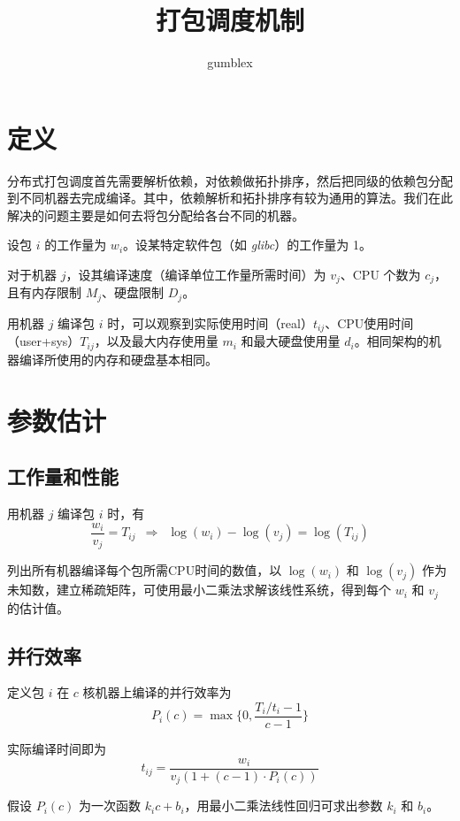\documentclass[UTF8,zihao=-4]{ctexart}
\title{打包调度机制}
\date{}
\author{gumblex}
\begin{document}
\maketitle

\section{定义}
分布式打包调度首先需要解析依赖，对依赖做拓扑排序，然后把同级的依赖包分配到不同机器去完成编译。其中，依赖解析和拓扑排序有较为通用的算法。我们在此解决的问题主要是如何去将包分配给各台不同的机器。

设包 $i$ 的工作量为 $w_i$。设某特定软件包（如 \textit{glibc}）的工作量为 1。

对于机器 $j$，设其编译速度（编译单位工作量所需时间）为 $v_j$、CPU 个数为 $c_j$，且有内存限制 $M_j$、硬盘限制 $D_j$。

用机器 $j$ 编译包 $i$ 时，可以观察到实际使用时间（real）$t_{ij}$、CPU使用时间（user+sys）$T_{ij}$，以及最大内存使用量 $m_i$ 和最大硬盘使用量 $d_i$。相同架构的机器编译所使用的内存和硬盘基本相同。

\section{参数估计}

\subsection{工作量和性能}

用机器 $j$ 编译包 $i$ 时，有
$$ \frac{w_i}{v_j} = T_{ij} \enspace \Rightarrow \enspace
\log(w_i) - \log(v_j) = \log(T_{ij})$$

列出所有机器编译每个包所需CPU时间的数值，以 $\log(w_i)$ 和 $\log(v_j)$ 作为未知数，建立稀疏矩阵，可使用最小二乘法求解该线性系统，得到每个 $w_i$ 和 $v_j$ 的估计值。

\subsection{并行效率}

定义包 $i$ 在 $c$ 核机器上编译的并行效率为 $$ P_i(c) = \max \{0, \frac{T_i/t_i-1}{c-1} \} $$

实际编译时间即为
\begin{equation}
\label{eq_ti} t_{ij} = \frac{w_i}{v_j (1 + (c-1) \cdot P_i(c))}
\end{equation}

假设 $ P_i(c) $ 为一次函数 $ k_i c + b_i $，用最小二乘法线性回归可求出参数 $k_i$ 和 $b_i$。
\end{document}
